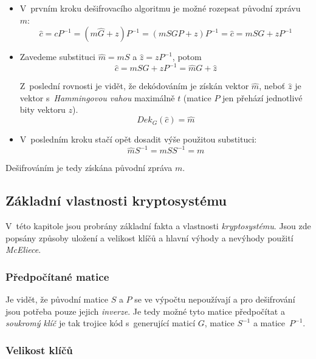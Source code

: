 \documentclass[thesis=M,czech,hidelinks]{FITthesis}[2012/06/26]
\newcommand{\0}{{\textcolor[gray]{0.80}{0}}}
\begin{document}
\begin{itemize}
    \item V~prvním kroku dešifrovacího algoritmu je možné rozepsat původní
        zprávu~$m$:
        $$
            \hat{c} = c P^{-1} = \left( m \hat{G} + z \right) P^{-1} =
            \left(m S G P + z \right) P^{-1} = \hat{c} = m S G + z P^{-1}
        $$

    \item Zavedeme substituci $\hat{m} = m S$ a $\hat{z} = z P^{-1}$, potom
        $$ \hat{c} = m S G + z P^{-1} = \hat{m} G + \hat{z} $$

        Z~poslední rovnosti je vidět, že dekódováním je získán vektor $\hat{m}$,
        neboť $\hat{z}$ je vektor s~\emph{Hammingovou vahou} maximálně $t$
        (matice $P$ jen přehází jednotlivé bity vektoru $z$).
        $$ Dek_{G}\left(\hat{c}\right) = \hat{m} $$

    \item V~posledním kroku stačí opět dosadit výše použitou substituci:
        $$ \hat{m} S^{-1} = m S S^{-1} = m $$

\end{itemize}

Dešifrováním je tedy získána původní zpráva $m$.

\subsection{Základní vlastnosti kryptosystému}

V~této kapitole jsou probrány základní fakta a vlastnosti \emph{kryptosystému}.
Jsou zde popsány způsoby uložení a velikost klíčů a hlavní výhody a nevýhody
použití \emph{McEliece}.

\subsubsection{Předpočítané matice}

Je vidět, že původní matice $S$ a $P$ se ve výpočtu nepoužívají a pro
dešifrování jsou potřeba pouze jejich \emph{inverze}. Je tedy možné tyto matice
předpočítat a \emph{soukromý klíč} je tak trojice kód s~generující maticí $G$,
matice $S^{-1}$ a matice~$P^{-1}$.

\subsubsection{Velikost klíčů}\label{kap_velikost_klicu}
\end{document}
